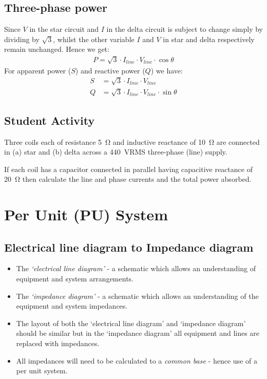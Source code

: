 \documentclass[class=report, crop=false, 12pt,a4paper]{standalone}
\begin{document}
\subsection{Three-phase power}
Since $V$ in the star circuit and $I$ in the delta circuit is subject to change simply by dividing by $\sqrt{3}$, whilst the other variable $I$ and $V$ in star and delta respectively remain unchanged. Hence we get:
\begin{gather}
	P = \sqrt{3} \cdot I_{line} \cdot V_{line} \cdot \cos \theta
\end{gather}
For apparent power ($S$) and reactive power ($Q$) we have:
\begin{align}
	S & = \sqrt{3} \cdot I_{line} \cdot V_{line}                   \\
	Q & = \sqrt{3} \cdot I_{line} \cdot V_{line} \cdot \sin \theta
\end{align}
\subsection{Student Activity}
Three coils each of resistance \SI{5}{\ohm} and inductive reactance of \SI{10}{\ohm} are connected in (a) star and (b) delta across a \SI{440}{VRMS} three-phase (line) supply.

If each coil has a capacitor connected in parallel having capacitive reactance of \SI{20}{\ohm} then calculate the line and phase currents and the total power absorbed.
\section{Per Unit (PU) System}
\subsection{Electrical line diagram to Impedance diagram}
\begin{itemize}
	\item The \textit{`electrical line diagram'} - a schematic which allows an understanding of equipment and system arrangements.
	\item The \textit{`impedance diagram'} - a schematic which allows an understanding of the equipment and system impedances.
	\item The layout of both the `electrical line diagram' and `impedance diagram' should be similar but in the `impedance diagram' all equipment and lines are replaced with impedances.
	\item All impedances will need to be calculated to a \textit{common base} - hence use of a per unit system.
\end{itemize}
\end{document}

